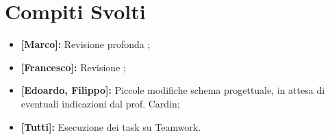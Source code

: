 \documentclass[../verbale-2017-02-28.tex]{subfiles}
\begin{document}
	\section{Compiti Svolti}
	\begin{itemize}
			\item \textbf{[Marco]:} Revisione profonda \pianodiqualificaRR;
			\item \textbf{[Francesco]:} Revisione \normediprogettoRR ;
			\item \textbf{[Edoardo, Filippo]:} Piccole modifiche schema progettuale, in attesa di eventuali indicazioni dal prof. Cardin;
		\item \textbf{[Tutti]:} Esecuzione dei task su Teamwork.
	\end{itemize}
\end{document}
